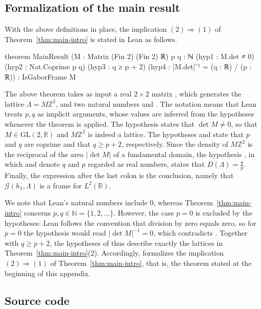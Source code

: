 \documentclass[reqno,a4paper,12pt]{amsart}
\numberwithin{equation}{section}
\newcommand{\N}{\mathbb N}
\newcommand{\Z}{\mathbb Z}
\newcommand{\R}{\mathbb R}
\newcommand{\calG}{\mathcal G}
\begin{document}
\subsection{Formalization of the main result}

With the above definitions in place, the implication $(2)\Rightarrow(1)$ of Theorem~\ref{thm:main-intro} is stated in Lean as follows.

\begin{leancode}
theorem MainResult
    (M : Matrix (Fin 2) (Fin 2) ℝ) {p q : ℕ}
    (hyp1 : M.det ≠ 0)
    (hyp2 : Nat.Coprime p q)
    (hyp3 : q ≥ p + 2)
    (hyp4 : |M.det|⁻¹ = (q : ℝ) / (p : ℝ)) :
    IsGaborFrame M
\end{leancode}

The above theorem takes as input a real $2\times2$ matrix , which generates the lattice $\Lambda=M\Z^2$, and two natural numbers  and . The notation  means that Lean treats $p,q$ as implicit arguments, whose values are inferred from the hypotheses whenever the theorem is applied. The hypothesis  states that $\det M\neq0$, so that $M\in\mathrm{GL}(2,\R)$ and $M\Z^2$ is indeed a lattice. The hypotheses  and  state that $p$ and $q$ are coprime and that $q\geq p+2$, respectively. Since the density of $M\Z^2$ is the reciprocal of the area $|\det M|$ of a fundamental domain, the hypothesis , in which  and  denote $q$ and $p$ regarded as real numbers, states that $D(\Lambda)=\frac qp$. Finally, the expression after the last colon is the conclusion, namely that $\calG(h_1,\Lambda)$ is a frame for $L^2(\R)$.

We note that Lean's natural numbers include $0$, whereas Theorem~\ref{thm:main-intro} concerns $p,q\in\N=\{1,2,\ldots\}$. However, the case $p=0$ is excluded by the hypotheses: Lean follows the convention that division by zero equals zero, so for $p=0$ the hypothesis  would read $|\det M|^{-1}=0$, which contradicts . Together with $q\geq p+2$, the hypotheses of  thus describe exactly the lattices in Theorem~\ref{thm:main-intro}(2). Accordingly,  formalizes the implication $(2)\Rightarrow(1)$ of Theorem~\ref{thm:main-intro}, that is, the theorem stated at the beginning of this appendix.

\subsection{Source code}\label{sec:lean-source}
\end{document}
